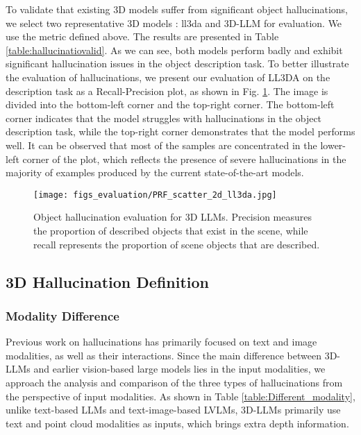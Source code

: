 To validate that existing 3D models suffer from significant object hallucinations, we select two representative 3D models : ll3da and 3D-LLM for evaluation. We use the metric defined above. The results are presented in Table \ref{table:hallucinatiovalid}. As we can see, both models perform badly and exhibit significant hallucination issues in the object description task. To better illustrate the evaluation of hallucinations, we present our evaluation of LL3DA on the description task as a Recall-Precision plot, as shown in Fig. \ref{fig:hallucination_eva}. The image is divided into the bottom-left corner and the top-right corner. The bottom-left corner indicates that the model struggles with hallucinations in the object description task, while the top-right corner demonstrates that the model performs well.  It can be observed that most of the samples are concentrated in the lower-left corner of the plot, which reflects the presence of severe hallucinations in the majority of examples produced by the current state-of-the-art models.

\begin{figure}[H]
\begin{center}
\begin{minipage}{0.9\linewidth}
    \texttt{[image: figs\_evaluation/PRF\_scatter\_2d\_ll3da.jpg]}
     \caption{Object hallucination evaluation for 3D LLMs. Precision measures the proportion of described objects that exist in the scene, while recall represents the proportion of scene objects that are described.}
     \label{fig:hallucination_eva}
\end{minipage}
\end{center}
\end{figure}
\subsection{3D Hallucination Definition}

\subsubsection{Modality Difference}
Previous work on hallucinations has primarily focused on text and image modalities, as well as their interactions. Since the main difference between 3D-LLMs and earlier vision-based large models lies in the input modalities, we approach the analysis and comparison of the three types of hallucinations from the perspective of input modalities.
As shown in Table \ref{table:Different_modality}, unlike text-based LLMs and text-image-based LVLMs, 3D-LLMs primarily use text and point cloud modalities as inputs, which brings extra depth information.

